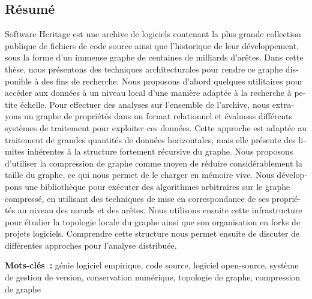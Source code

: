 \begin{otherlanguage}{french}
\section*{Résumé}
\begin{SingleSpace}

Software Heritage est une archive de logiciels contenant la plus
grande collection publique de fichiers de code source ainsi que l'historique de
leur développement, sous la forme d'un immense graphe de centaines de milliards
d'arêtes. Dans cette thèse, nous présentons des techniques architecturales pour
rendre ce graphe disponible à des fins de recherche. Nous proposons d'abord
quelques utilitaires pour accéder aux données à un niveau local d'une manière
adaptée à la recherche à petite échelle. Pour effectuer des analyses sur
l'ensemble de l'archive, nous extrayons un graphe de propriétés dans un format
relationnel et évaluons différents systèmes de traitement pour exploiter ces
données. Cette approche est adaptée au traitement de grandes quantités de
données horizontales, mais elle présente des limites inhérentes à la structure
fortement récursive du graphe. Nous proposons d'utiliser la compression de
graphe comme moyen de réduire considérablement la taille du graphe, ce qui nous
permet de le charger en mémoire vive. Nous développons une bibliothèque pour
exécuter des algorithmes arbitraires sur le graphe compressé, en utilisant
des techniques de mise en correspondance de ses propriétés au
niveau des nœuds et des arêtes. Nous utilisons ensuite cette infrastructure
pour étudier la topologie locale du graphe ainsi que son organisation en forks
de projets logiciels. Comprendre cette structure nous permet ensuite de
discuter de différentes approches pour l'analyse distribuée.

\medskip

\textbf{Mots-clés~:} génie logiciel empirique, code source, logiciel
open-source, système de gestion de version, conservation numérique, topologie
de graphe, compression de graphe

\end{SingleSpace}
\end{otherlanguage}

\clearpage


